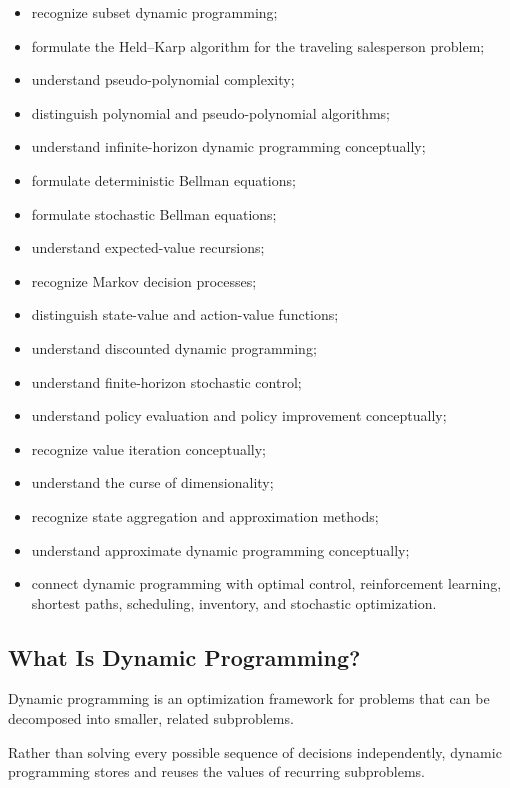 {\begin{itemize}
    \item recognize subset dynamic programming;
    \item formulate the Held--Karp algorithm for the traveling salesperson
          problem;
    \item understand pseudo-polynomial complexity;
    \item distinguish polynomial and pseudo-polynomial algorithms;
    \item understand infinite-horizon dynamic programming conceptually;
    \item formulate deterministic Bellman equations;
    \item formulate stochastic Bellman equations;
    \item understand expected-value recursions;
    \item recognize Markov decision processes;
    \item distinguish state-value and action-value functions;
    \item understand discounted dynamic programming;
    \item understand finite-horizon stochastic control;
    \item understand policy evaluation and policy improvement conceptually;
    \item recognize value iteration conceptually;
    \item understand the curse of dimensionality;
    \item recognize state aggregation and approximation methods;
    \item understand approximate dynamic programming conceptually;
    \item connect dynamic programming with optimal control,
          reinforcement learning, shortest paths, scheduling, inventory,
          and stochastic optimization.
\end{itemize}
}

\subsection{What Is Dynamic Programming?}
\label{subsec:what-is-dynamic-programming}

Dynamic programming is an optimization framework for problems that can be
decomposed into smaller, related subproblems.

Rather than solving every possible sequence of decisions independently,
dynamic programming stores and reuses the values of recurring
subproblems.

